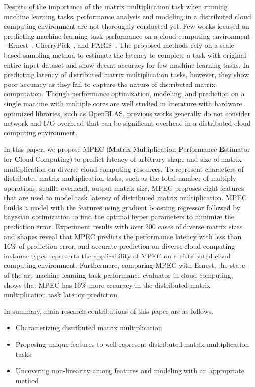\documentclass[10pt, conference, compsocconf]{IEEEtran}
\begin{document}
Despite of the importance of the matrix multiplication task when running machine learning tasks, performance analysis and modeling in a distributed cloud computing environment are not thoroughly conducted yet. Few works focused on predicting machine learning task performance on a cloud computing environment - Ernest~\cite{ernest}, CherryPick~\cite{cherrypick}, and PARIS~\cite{paris}. The proposed methods rely on a scale-based sampling method to estimate the latency to complete a task with original entire input dataset and show decent accuracy for few machine learning tasks. In predicting latency of distributed matrix multiplication tasks, however, they show poor accuracy as they fail to capture the nature of distributed matrix computation. Though performance optimization, modeling, and prediction on a single machine with multiple cores are well studied in literature with hardware optimized libraries, such as OpenBLAS, previous works generally do not consider network and I/O overhead that can be significant overhead in a distributed cloud computing environment.

In this paper, we propose MPEC (\textbf{M}atrix Multiplication \textbf{P}erformance \textbf{E}stimator for \textbf{C}loud Computing) to predict latency of arbitrary shape and size of matrix multiplication on diverse cloud computing resources. To represent characters of distributed matrix multiplication tasks, such as the total number of multiply operations, shuffle overhead, output matrix size, MPEC proposes eight features that are used to model task latency of distributed matrix multiplication. MPEC builds a model with the features using gradient boosting regressor followed by bayesian optimization to find the optimal hyper parameters to minimize the prediction error. Experiment results with over 200 cases of diverse matrix sizes and shapes reveal that MPEC predicts the performance latency with less than 16\% of prediction error, and accurate prediction on diverse cloud computing instance types represents the applicability of MPEC on a distributed cloud computing environment. Furthermore, comparing MPEC with Ernest, the state-of-the-art machine learning task performance evaluator in cloud computing, shows that MPEC has 16\% more accuracy in the distributed matrix multiplication task latency prediction.

In summary, main research contributions of this paper are as follows.
\begin{itemize}
  \item{Characterizing distributed matrix multiplication}
  \item{Proposing unique features to well represent distributed matrix multiplication tasks}
  \item{Uncovering non-linearity among features and modeling with an appropriate method}
\end{itemize}
\end{document}
